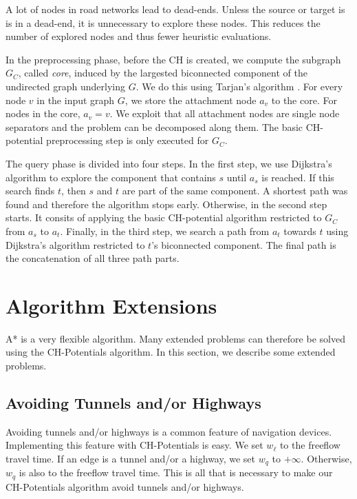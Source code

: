 \documentclass[letterpaper]{article} %
\begin{document}
A lot of nodes in road networks lead to dead-ends.
Unless the source or target is is in a dead-end, it is unnecessary to explore these nodes.
This reduces the number of explored nodes and thus fewer heuristic evaluations.

In the preprocessing phase, before the CH is created, we compute the subgraph $G_C$, called \emph{core}, induced by the largested biconnected component of the undirected graph underlying $G$.
We do this using Tarjan's algorithm \cite{t-dfslg2-72}.
For every node $v$ in the input graph $G$, we store the attachment node $a_v$ to the core.
For nodes in the core, $a_v=v$.
We exploit that all attachment nodes are single node separators and the problem can be decomposed along them.
The basic CH-potential preprocessing step is only executed for $G_C$.

The query phase is divided into four steps.
In the first step, we use Dijkstra's algorithm to explore the component that contains $s$ until $a_s$ is reached.
If this search finds $t$, then $s$ and $t$ are part of the same component.
A shortest path was found and therefore the algorithm stops early.
Otherwise, in the second step starts.
It consits of applying the basic CH-potential algorithm restricted to $G_C$ from $a_s$ to $a_t$.
Finally, in the third step, we search a path from $a_t$ towards $t$ using Dijkstra's algorithm restricted to $t$'s biconnected component.
The final path is the concatenation of all three path parts.

\section{Algorithm Extensions}
\label{sec:extensions}

A* is a very flexible algorithm.
Many extended problems can therefore be solved using the CH-Potentials algorithm.
In this section, we describe some extended problems.

\subsection{Avoiding Tunnels and/or Highways}
\label{sec:no-tunnel-highway}

Avoiding tunnels and/or highways is a common feature of navigation devices.
Implementing this feature with CH-Potentials is easy.
We set $w_\ell$ to the freeflow travel time.
If an edge is a tunnel and/or a highway, we set $w_q$ to $+\infty$.
Otherwise, $w_q$ is also to the freeflow travel time.
This is all that is necessary to make our CH-Potentials algorithm avoid tunnels and/or highways.
\end{document}
